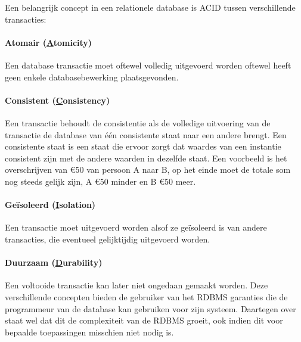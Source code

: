 Een belangrijk concept in een relationele database is ACID tussen verschillende transacties:

\paragraph{Atomair (\underline{A}tomicity)} Een database transactie moet oftewel volledig uitgevoerd worden oftewel heeft geen enkele databasebewerking plaatsgevonden. 

	\paragraph{Consistent (\underline{C}onsistency)} Een transactie behoudt de consistentie als de volledige uitvoering van de transactie de database van één consistente staat naar een andere brengt. Een consistente staat is een staat die ervoor zorgt dat waardes van een instantie consistent zijn met de andere waarden in dezelfde staat. Een voorbeeld is het overschrijven van \euro{50} van persoon A naar B, op het einde moet de totale som nog steeds gelijk zijn, A \euro{50} minder en B \euro{50} meer. 
	
	\paragraph{Geïsoleerd (\underline{I}solation)} Een transactie moet uitgevoerd worden alsof ze geïsoleerd is van andere transacties, die eventueel gelijktijdig uitgevoerd worden. 
	
	\paragraph{Duurzaam (\underline{D}urability)} Een voltooide transactie kan later niet ongedaan gemaakt worden.
Deze verschillende concepten bieden de gebruiker van het R\gls{DBMS} garanties die de programmeur van de database kan gebruiken voor zijn systeem. Daartegen over staat wel dat dit de complexiteit van de RDBMS groeit, ook indien dit voor bepaalde toepassingen misschien niet nodig is.

